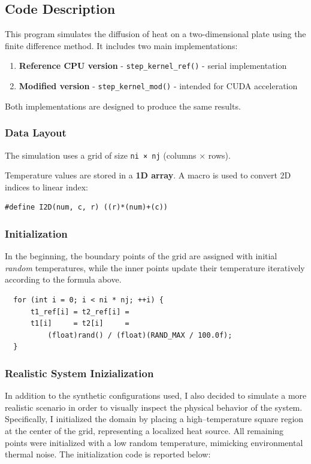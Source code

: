 \subsection{Code Description}
This program simulates the diffusion of heat on a two-dimensional plate using the finite difference method. It includes two main implementations:
\begin{enumerate}
    \item \textbf{Reference CPU version} - \texttt{step\_kernel\_ref()} - serial implementation
    \item \textbf{Modified version} - \texttt{step\_kernel\_mod()} - intended for CUDA acceleration
\end{enumerate}

Both implementations are designed to produce the same results.

\subsubsection*{Data Layout}
The simulation uses a grid of size \texttt{ni × nj} (columns × rows).

\noindent
Temperature values are stored in a \textbf{1D array}. A macro is used to convert 2D indices to linear index:

\begin{lstlisting}
#define I2D(num, c, r) ((r)*(num)+(c))
\end{lstlisting}

\subsubsection*{Initialization}
In the beginning, the boundary points of the grid are assigned with initial \textit{random} temperatures, while the inner points update their temperature iteratively according to the formula above.\\

\begin{lstlisting}
  for (int i = 0; i < ni * nj; ++i) {
      t1_ref[i] = t2_ref[i] =
      t1[i]     = t2[i]     =
          (float)rand() / (float)(RAND_MAX / 100.0f);
  }
\end{lstlisting}

\subsubsection*{Realistic System Inizialization}

In addition to the synthetic configurations used, I also decided to simulate a more realistic scenario in order to visually inspect the physical behavior of the system.  
Specifically, I initialized the domain by placing a high–temperature square region at the center of the grid, representing a localized heat source. All remaining points were initialized with a low random temperature, mimicking environmental thermal noise.  
The initialization code is reported below:


